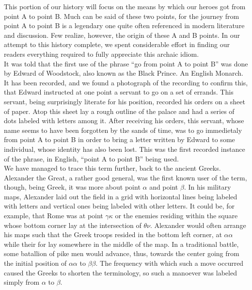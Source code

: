 \documentclass[12pt,openany]{memoir}
\begin{document}
This portion of our history will focus on the means by which our heroes got from point A to point B.
Much can be said of these two points, for the journey from point A to point B is a legendary one quite often referenced in modern literature and discussion.
Few realize, however, the origin of these A and B points.
In our attempt to this history complete, we spent considerable effort in finding our readers everything required to fully appreciate this archaic idiom.
\\

It was told that the first use of the phrase ``go from point A to point B'' was done by Edward of Woodstock, also known as the Black Prince.
An English Monarch.
It has been recorded, and we found a photograph of the recording to confirm this, that Edward instructed at one point a servant to go on a set of errands.
This servant, being surprisingly literate for his position, recorded his orders on a sheet of paper.
Atop this sheet lay a rough outline of the palace and had a series of dots labeled with letters among it.
After receiving his orders, this servant, whose name seems to have been forgotten by the sands of time, was to go immedietaly from point A to point B in order to bring a letter written by Edward to some individual, whose identity has also been lost.
This was the first recorded instance of the phrase, in English, ``point A to point B'' being used.
\\

We have managed to trace this term further, back to the ancient Greeks.
Alexander the Great, a rather good general, was the first known user of the term, though, being Greek, it was more about point $\alpha$ and point $\beta$.
In his military maps, Alexander laid out the field in a grid with horizontal lines being labeled with letters and vertical ones being labeled with other letters.
It could be, for example, that Rome was at point $\gamma\kappa$ or the enemies residing within the square whose bottom corner lay at the intersection of $\theta\nu$.
Alexander would often arrange his maps such that the Greek troops resided in the bottom left corner, at $\alpha\alpha$ while their for lay somewhere in the middle of the map.
In a traditional battle, some batallion of pike men would advance, thus, towards the center going from the initial position of $\alpha\alpha$ to $\beta\beta$.
The frequency with which such a move occurred caused the Greeks to shorten the terminology, so such a manoever was labeled simply from $\alpha$ to $\beta$.
\\
\end{document}
